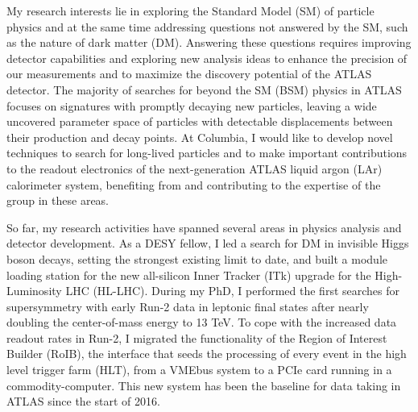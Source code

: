 \documentclass[a4paper]{article}
\begin{document}
\thispagestyle{fancy} 
 \lfoot{} \rfoot{\bf \thepage} \cfoot{}

\fontsize{11}{14}
\selectfont


My research interests lie in exploring the Standard Model (SM) of particle physics and at the same time addressing questions not answered by the SM, such as the nature of dark matter (DM). Answering these questions requires improving detector capabilities and exploring new analysis ideas to enhance the precision of our measurements and to maximize the discovery potential of the ATLAS detector. The majority of searches for beyond the SM (BSM) physics in ATLAS focuses on signatures with promptly decaying new particles, leaving a wide uncovered parameter space of particles with detectable displacements between their production and decay points. At Columbia, I would like to develop
novel techniques to search for long-lived particles and to make important contributions to the readout electronics of the next-generation ATLAS liquid argon (LAr) calorimeter system, benefiting from and contributing to the expertise of the group in these areas.

\bigskip

So far, my research activities have spanned several areas in physics analysis and detector development. As a DESY fellow, I led a search for DM in invisible Higgs boson decays, setting the strongest existing limit to date, and built a module loading station for the new all-silicon Inner Tracker (ITk) upgrade for the High-Luminosity LHC (HL-LHC). During my PhD, I performed the first searches for supersymmetry with early Run-2 data in leptonic final states after nearly doubling the center-of-mass energy to 13 TeV. To cope with the increased data readout rates in Run-2, I migrated the functionality of the Region of Interest Builder (RoIB), the interface that seeds the processing of every event in the high level trigger farm (HLT), from a VMEbus system to a PCIe card running in a commodity-computer. This new system has been the baseline for data taking in ATLAS since the start of 2016.

\bigskip
\end{document}
